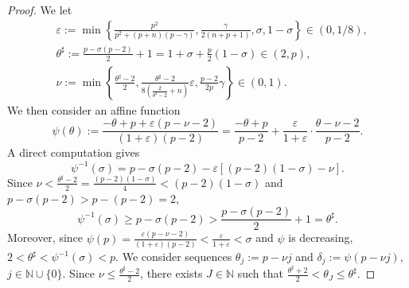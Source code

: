 \documentclass[11pt,oneside,english]{amsart}
\newcommand{\e}{\varepsilon}
\newcommand{\de}{\delta}
\numberwithin{equation}{section}
\theoremstyle{plain}
\numberwithin{equation}{section}
\begin{document}
\begin{proof}
We let
\begin{align*}
&\e:=\min\left\{\frac{p^2}{p^2+(p+n)(p-\gamma)}, \frac{\gamma}{2(n+p+1)},\sigma, 1-\sigma\right\}\in(0,1/8),\\
&\theta^\sharp:=\frac{p-\sigma(p-2)}2+1=1+\sigma+\frac{p}2(1-\sigma)\in(2,p),\\
&\nu:=\min\left\{\frac{\theta^\sharp-2}2, \frac{\theta^\sharp-2  }{8\left(\frac2{\theta^\sharp-2}+n \right)  }\e, \frac{p-2}{2p}\gamma \right\}\in(0,1).
\end{align*}
We then consider an affine function
$$
\psi(\theta):=\frac{-\theta+p+\e(p-\nu-2) }{(1+\e)(p-2) }=\frac{-\theta+p}{p-2}+\frac{\e}{1+\e}\cdot\frac{\theta-\nu-2}{p-2}.
$$
A direct computation gives
$$
\psi^{-1}(\sigma)=p-\sigma(p-2)-\e[(p-2)(1-\sigma)-\nu].
$$
Since $\nu<\frac{\theta^\sharp-2}2=\frac{(p-2)(1-\sigma)}4<(p-2)(1-\sigma)$ and $p-\sigma(p-2)>p-(p-2)=2$,
$$
\psi^{-1}(\sigma)\ge p-\sigma(p-2)>\frac{p-\sigma(p-2)}2+1=\theta^\sharp.
$$
Moreover, since $\psi(p)=\frac{\e(p-\nu-2)}{(1+\e)(p-2)}<\frac{\e}{1+\e}<\sigma$ and $\psi$ is decreasing, $2<\theta^\sharp<\psi^{-1}(\sigma)<p$. We consider sequences $\theta_j:=p-\nu j$ and $\de_j:=\psi(p-\nu j)$, $j\in \mathbb{N}\cup\{0\}$. Since $\nu\le\frac{\theta^\sharp-2}2$, there exists $J\in \mathbb{N}$ such that $\frac{\theta^\sharp+2}2<\theta_J\le \theta^\sharp$. 


\end{proof}
\end{document}
